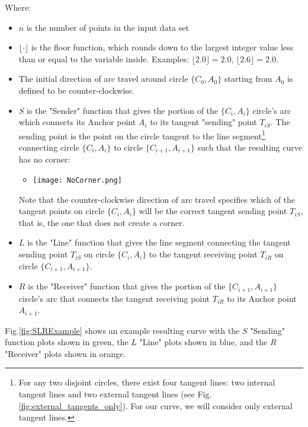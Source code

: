\documentclass{article}
\begin{document}
Where:
\begin{itemize}
    \item $n$ is the number of points in the input data set
    \item $\lfloor \cdot \rfloor$ is the floor function, which rounds down to the largest integer value less than or equal to the variable inside. Examples: $\lfloor 2.0 \rfloor = 2.0$, $\lfloor 2.6 \rfloor = 2.0$.
    \item The initial direction of arc travel around circle $\{C_0, A_0\}$ starting from $A_0$ is defined to be counter-clockwise.
    \item $S$ is the "Sender" function that gives the portion of the $\{C_i, A_i\}$ circle's arc which connects its Anchor point $A_i$ to its tangent "sending" point $T_{iS}$. The sending point is the point on the circle tangent to the line segment\footnote{For any two disjoint circles, there exist four tangent lines: two internal tangent lines and two external tangent lines (see Fig.     \ref{fig:external_tangents_only}). For our curve, we will consider only external tangent lines.} connecting circle $\{C_i, A_i\}$ to circle $\{C_{i+1}, A_{i+1}\}$ such that the resulting curve has no corner:
    \begin{itemize}
        \item \texttt{[image: NoCorner.png]}
    \end{itemize}
    Note that the counter-clockwise direction of arc travel specifies which of the tangent points on circle $\{C_i, A_i\}$ will be the correct tangent sending point $T_{iS}$, that is, the one that does not create a corner.
    \item $L$ is the "Line" function that gives the line segment connecting the tangent sending point $T_{iS}$ on circle $\{C_i, A_i\}$ to the tangent receiving point $T_{iR}$ on circle $\{C_{i+1}, A_{i+1}\}$.
    \item $R$ is the "Receiver" function that gives the portion of the $\{C_{i+1}, A_{i+1}\}$ circle's arc that connects the tangent receiving point $T_{iR}$ to its Anchor point $A_{i+1}$.
\end{itemize}
Fig.\ref{fig:SLRExample} shows an example resulting curve with the $S$ "Sending" function plots shown in green, the $L$ "Line" plots shown in blue, and the $R$ "Receiver" plots shown in orange.
\end{document}
